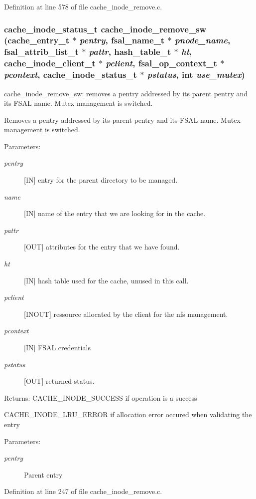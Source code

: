 Definition at line 578 of file cache\_\-inode\_\-remove.c.
\subsubsection[{cache\_\-inode\_\-remove\_\-sw}]{\setlength{\rightskip}{0pt plus 5cm}cache\_\-inode\_\-status\_\-t cache\_\-inode\_\-remove\_\-sw (cache\_\-entry\_\-t $\ast$ {\em pentry}, \/  fsal\_\-name\_\-t $\ast$ {\em pnode\_\-name}, \/  fsal\_\-attrib\_\-list\_\-t $\ast$ {\em pattr}, \/  hash\_\-table\_\-t $\ast$ {\em ht}, \/  cache\_\-inode\_\-client\_\-t $\ast$ {\em pclient}, \/  fsal\_\-op\_\-context\_\-t $\ast$ {\em pcontext}, \/  cache\_\-inode\_\-status\_\-t $\ast$ {\em pstatus}, \/  int {\em use\_\-mutex})}\label{cache__inode__remove_8c_3a3242748669826a54bf59b571a93640}


cache\_\-inode\_\-remove\_\-sw: removes a pentry addressed by its parent pentry and its FSAL name. Mutex management is switched.

Removes a pentry addressed by its parent pentry and its FSAL name. Mutex management is switched.

\begin{Desc}
\item[Parameters:]
\begin{description}
\item[{\em pentry}][IN] entry for the parent directory to be managed. \item[{\em name}][IN] name of the entry that we are looking for in the cache. \item[{\em pattr}][OUT] attributes for the entry that we have found. \item[{\em ht}][IN] hash table used for the cache, unused in this call. \item[{\em pclient}][INOUT] ressource allocated by the client for the nfs management. \item[{\em pcontext}][IN] FSAL credentials \item[{\em pstatus}][OUT] returned status.\end{description}
\end{Desc}
\begin{Desc}
\item[Returns:]CACHE\_\-INODE\_\-SUCCESS if operation is a success \par
 

CACHE\_\-INODE\_\-LRU\_\-ERROR if allocation error occured when validating the entry \end{Desc}
\begin{Desc}
\item[Parameters: ]\par
\begin{description}
\item[{\em 
pentry}]Parent entry \end{description}
\end{Desc}


Definition at line 247 of file cache\_\-inode\_\-remove.c.